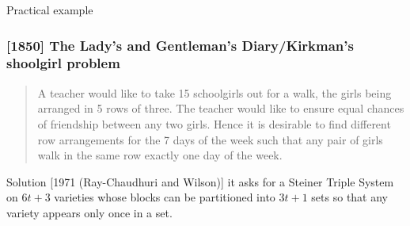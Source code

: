 \begin{frame}[plain,c]
\begin{center}
	\huge Practical example
\end{center}
\end{frame}


\begin{frame}
\frametitle{[1850] The Lady's and Gentleman's Diary/Kirkman's shoolgirl problem}

\begin{quote}
	A teacher would like to take 15 schoolgirls out for a walk, the girls being arranged in 5 rows of three. The teacher would like to ensure equal chances of friendship between any two girls. Hence it is desirable to find different row arrangements for the 7 days of the week such that any pair of girls walk in the same row exactly one day of the week. 
\end{quote}
\pause
\begin{block}{Solution}
	[1971 (Ray-Chaudhuri and Wilson)] it asks for a Steiner Triple System on $6t +3$ varieties whose blocks can be partitioned into $3t + 1$ sets so that any variety appears only once in a set.\\
\end{block}%
\end{frame}
\begin{comment}
Steiner triple systems were apparently defined for the first time by W. S. B. Wool-
house [35] (Prize question 1733, Lady’s and Gentlemens’ Diary, 1844)


In 1853 J. Steiner posed the sufficiency of this theorem as a problem and it was proved in 1859 by M. Reiss. Neither mathematician was aware of the fact that the problem had been posed and solved by T.P. Kirkman in an 1847 article appearing in the Cambridge and Dublin Mathematical Journal. Indeed, in 1850 Kirkman went on to pose a more difficult but related problem. This problem, which appeared in "The Lady's and Gentleman's Diary" of 1850, has become to be known as Kirkman's Schoolgirl Problem and was presented as follows:



\end{comment} 